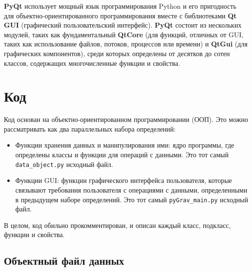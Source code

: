 \textbf{\textsf{PyQt}} использует мощный язык программирования Python и его
пригодность для объектно-ориентированного программирования вместе с библиотеками
\textbf{\textsf{Qt GUI}} (графический пользовательский интерфейс).
\textbf{\textsf{PyQt}} состоит из нескольких модулей, таких как фундаментальный
\textbf{\textsf{QtCore}} (для функций, отличных от GUI, таких как использование
файлов, потоков, процессов или времени) и \textbf{\textsf{QtGui}} (для
графических компонентов), среди которых определены от десятков до сотен классов,
содержащих многочисленные функции и свойства.

\section[Код pyGrav]{Код \pg{}}
\label{sec:pygrav_code}

Код основан на объектно-ориентированном программировании (ООП). Это можно
рассматривать как два параллельных набора определений:
\begin{itemize}
    \item Функции хранения данных и манипулирования ими: ядро программы, где
    определены классы и функции для операций с данными. Это тот самый
    \verb|data_object.py| исходный файл.

    \item Функции GUI: функции графического интерфейса пользователя, которые
    связывают требования пользователя с операциями с данными, определенными в
    предыдущем наборе определений. Это тот самый \verb|pyGrav_main.py| исходный
    файл.
    
\end{itemize}

В целом, код обильно прокомментирован, и описан каждый класс, подкласс, функции и свойства.

\subsection[Объектный файл данных]{Объектный файл данных}
\label{subsec:data_object_file}

